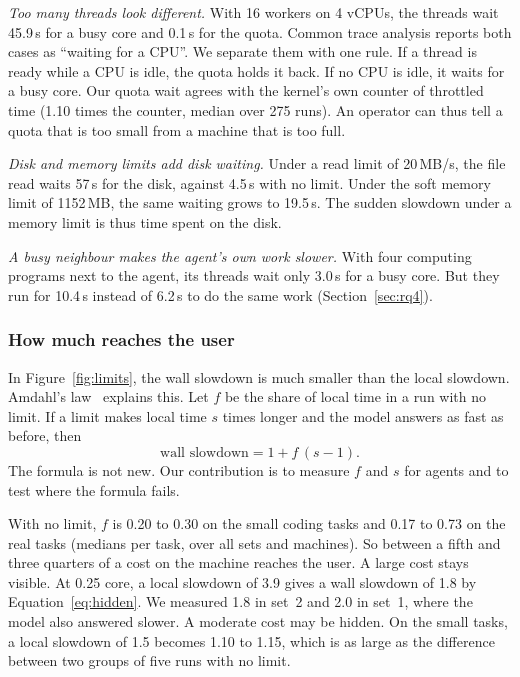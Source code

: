\documentclass[sigconf,review,anonymous]{acmart}
\begin{document}
\emph{Too many threads look different.} With 16 workers on 4 vCPUs, the
threads wait 45.9\,s for a busy core and 0.1\,s for the quota. Common
trace analysis reports both cases as ``waiting for a CPU''. We separate
them with one rule. If a thread is ready while a CPU is idle, the quota
holds it back. If no CPU is idle, it waits for a busy core. Our quota
wait agrees with the kernel's own counter of throttled time (1.10 times
the counter, median over 275 runs). An operator can thus tell a quota
that is too small from a machine that is too full.

\emph{Disk and memory limits add disk waiting.} Under a read limit of
20\,MB/s, the file read waits 57\,s for the disk, against 4.5\,s with no
limit. Under the soft memory limit of 1152\,MB, the same waiting grows
to 19.5\,s. The sudden slowdown under a memory limit is thus time spent
on the disk.

\emph{A busy neighbour makes the agent's own work slower.} With four
computing programs next to the agent, its threads wait only 3.0\,s for a
busy core. But they run for 10.4\,s instead of 6.2\,s to do the same
work (Section~\ref{sec:rq4}).

\subsubsection{How much reaches the user}

In Figure~\ref{fig:limits}, the wall slowdown is much smaller than the
local slowdown. Amdahl's law~\cite{amdahl1967} explains this. Let $f$ be
the share of local time in a run with no limit. If a limit makes local
time $s$ times longer and the model answers as fast as before, then
\begin{equation}
\text{wall slowdown} = 1 + f\,(s - 1).
\label{eq:hidden}
\end{equation}
The formula is not new. Our contribution is to measure $f$ and $s$ for
agents and to test where the formula fails.

With no limit, $f$ is 0.20 to 0.30 on the small coding tasks and 0.17 to
0.73 on the real tasks (medians per task, over all sets and machines).
So between a fifth and three quarters of a cost on the machine reaches
the user. A large cost stays visible. At 0.25 core, a local slowdown of
3.9 gives a wall slowdown of 1.8 by Equation~\ref{eq:hidden}. We
measured 1.8 in set~2 and 2.0 in set~1, where the model also answered
slower. A moderate cost may be hidden. On the small tasks, a local
slowdown of 1.5 becomes 1.10 to 1.15, which is as large as the
difference between two groups of five runs with no limit.
\end{document}
